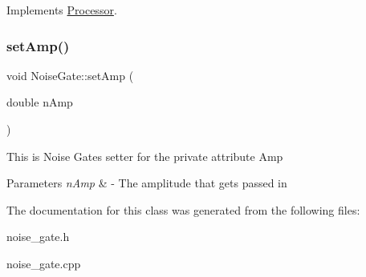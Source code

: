 Implements \hyperlink{classProcessor_a705ddc9aa4c2400a30691fc9888c8e9e}{Processor}.

\mbox{\label{classNoiseGate_a9fef7751dbab94fa02c897a87bed449e}} 
\subsubsection{\texorpdfstring{set\+Amp()}{setAmp()}}
{\footnotesize\ttfamily void Noise\+Gate\+::set\+Amp (\begin{DoxyParamCaption}\item[{double}]{n\+Amp }\end{DoxyParamCaption})}

This is Noise Gate\textquotesingle{}s setter for the private attribute Amp 
\begin{DoxyParams}{Parameters}
{\em n\+Amp} & -\/ The amplitude that gets passed in \\
\hline
\end{DoxyParams}


The documentation for this class was generated from the following files\+:\begin{DoxyCompactItemize}
\item 
noise\+\_\+gate.\+h\item 
noise\+\_\+gate.\+cpp\end{DoxyCompactItemize}
